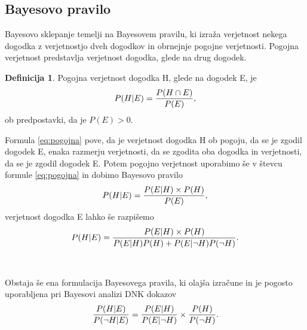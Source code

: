 \documentclass[12pt,a4paper]{amsart}
\theoremstyle{definition} %
\newtheorem{definicija}{Definicija}[section]
\theoremstyle{plain} %
\begin{document}
\subsection{Bayesovo pravilo}
Bayesovo sklepanje temelji na Bayesovem pravilu, ki izraža verjetnost nekega dogodka z verjetnostjo dveh dogodkov in obrnejnje pogojne
verjetnosti. Pogojna verjetnost predstavlja verjetnost dogodka, glede na drug dogodek.
\begin{definicija}
   Pogojna verjetnost dogodka H, glede na dogodek E, je
   \begin{equation}\label{eq:pogojna}
        P(H \lvert E) = \frac{P(H \cap E)}{P(E)}, \vspace{2mm}
   \end{equation}
   ob predpostavki, da je $P(E) > 0$.
\end{definicija}
Formula \eqref{eq:pogojna} pove, da je verjetnost dogodka H ob pogoju, da se je zgodil dogodek E, enaka razmerju verjetnosti, da se
zgodita oba dogodka in verjetnosti, da se je zgodil dogodek E.
Potem pogojno verjetnost uporabimo še v števcu formule \eqref{eq:pogojna} in dobimo Bayesovo pravilo
\begin{equation}\label{eq:bpravilo}
   P(H \lvert E) = \frac{P(E \lvert H) \times P(H)}{P(E)}, \vspace{2mm}
\end{equation}  
verjetnost dogodka E lahko še razpišemo
\begin{equation}\label{eq:b_pravilo}
   P(H \lvert E) = \frac{P(E \lvert H) \times P(H)}{P(E \lvert H)P(H) + P(E \lvert \neg H)P(\neg H)}. \vspace{2mm}
\end{equation} \\\\
Obstaja še ena formulacija Bayesovega pravila, ki olajša izračune in je pogosto uporabljena pri Bayesovi analizi DNK dokazov
\begin{equation}\label{eq:b_pravilo_DNK}
   \frac{P(H \lvert E)}{P(\neg H \lvert E)} = \frac{P(E \lvert H)}{P(E \lvert \neg H)} \times \frac{P(H)}{P(\neg H)}. \vspace{2mm}
\end{equation}

\end{document}
